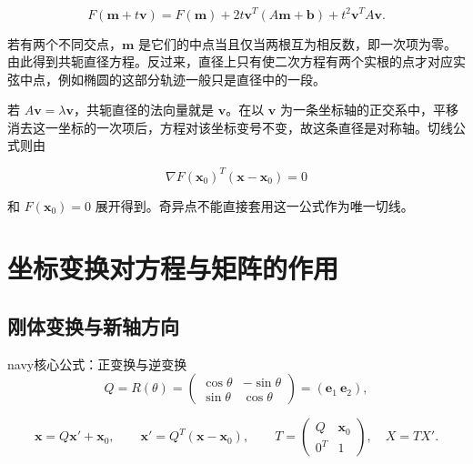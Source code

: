 \documentclass[11pt,a4paper]{article}
\begin{document}
\begin{equation*}
F(\boldsymbol m+t\boldsymbol v)=F(\boldsymbol m)+2t\boldsymbol v^T(A\boldsymbol m+\boldsymbol b)+t^2\boldsymbol v^TA\boldsymbol v.\tag{1.5}
\end{equation*}

若有两个不同交点，\(\boldsymbol m\)
是它们的中点当且仅当两根互为相反数，即一次项为零。由此得到共轭直径方程。反过来，直径上只有使二次方程有两个实根的点才对应实弦中点，例如椭圆的这部分轨迹一般只是直径中的一段。

若 \(A\boldsymbol v=\lambda\boldsymbol v\)，共轭直径的法向量就是
\(\boldsymbol v\)。在以 \(\boldsymbol v\)
为一条坐标轴的正交系中，平移消去这一坐标的一次项后，方程对该坐标变号不变，故这条直径是对称轴。切线公式则由

\begin{equation*}
\nabla F(\boldsymbol x_0)^T(\boldsymbol x-\boldsymbol x_0)=0
\end{equation*}

和 \(F(\boldsymbol x_0)=0\)
展开得到。奇异点不能直接套用这一公式作为唯一切线。

\section{坐标变换对方程与矩阵的作用}\label{ux5750ux6807ux53d8ux6362ux5bf9ux65b9ux7a0bux4e0eux77e9ux9635ux7684ux4f5cux7528}

\subsection{刚体变换与新轴方向}\label{ux521aux4f53ux53d8ux6362ux4e0eux65b0ux8f74ux65b9ux5411}

\begin{sboxenv}{navy}{核心公式：正变换与逆变换}
\begin{equation*}
Q=R(\theta)=\begin{pmatrix}\cos\theta&-\sin\theta\\\sin\theta&\cos\theta\end{pmatrix}=(\boldsymbol e_1\ \boldsymbol e_2),
\end{equation*}

\begin{equation*}
\boldsymbol x=Q\boldsymbol x'+\boldsymbol x_0,\qquad \boldsymbol x'=Q^T(\boldsymbol x-\boldsymbol x_0),\qquad T=\begin{pmatrix}Q&\boldsymbol x_0\\0^T&1\end{pmatrix},\quad X=TX'.\tag{2.1}
\end{equation*}

\end{sboxenv}
\end{document}
